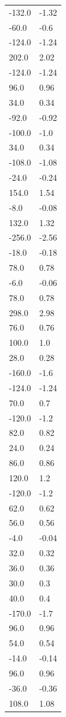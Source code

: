 \begin{longtable}{ll}
-132.0 & -1.32 \\
-60.0 & -0.6 \\
-124.0 & -1.24 \\
202.0 & 2.02 \\
-124.0 & -1.24 \\
96.0 & 0.96 \\
34.0 & 0.34 \\
-92.0 & -0.92 \\
-100.0 & -1.0 \\
34.0 & 0.34 \\
-108.0 & -1.08 \\
-24.0 & -0.24 \\
154.0 & 1.54 \\
-8.0 & -0.08 \\
132.0 & 1.32 \\
-256.0 & -2.56 \\
-18.0 & -0.18 \\
78.0 & 0.78 \\
-6.0 & -0.06 \\
78.0 & 0.78 \\
298.0 & 2.98 \\
76.0 & 0.76 \\
100.0 & 1.0 \\
28.0 & 0.28 \\
-160.0 & -1.6 \\
-124.0 & -1.24 \\
70.0 & 0.7 \\
-120.0 & -1.2 \\
82.0 & 0.82 \\
24.0 & 0.24 \\
86.0 & 0.86 \\
120.0 & 1.2 \\
-120.0 & -1.2 \\
62.0 & 0.62 \\
56.0 & 0.56 \\
-4.0 & -0.04 \\
32.0 & 0.32 \\
36.0 & 0.36 \\
30.0 & 0.3 \\
40.0 & 0.4 \\
-170.0 & -1.7 \\
96.0 & 0.96 \\
54.0 & 0.54 \\
-14.0 & -0.14 \\
96.0 & 0.96 \\
-36.0 & -0.36 \\
108.0 & 1.08 \\

\end{longtable}
